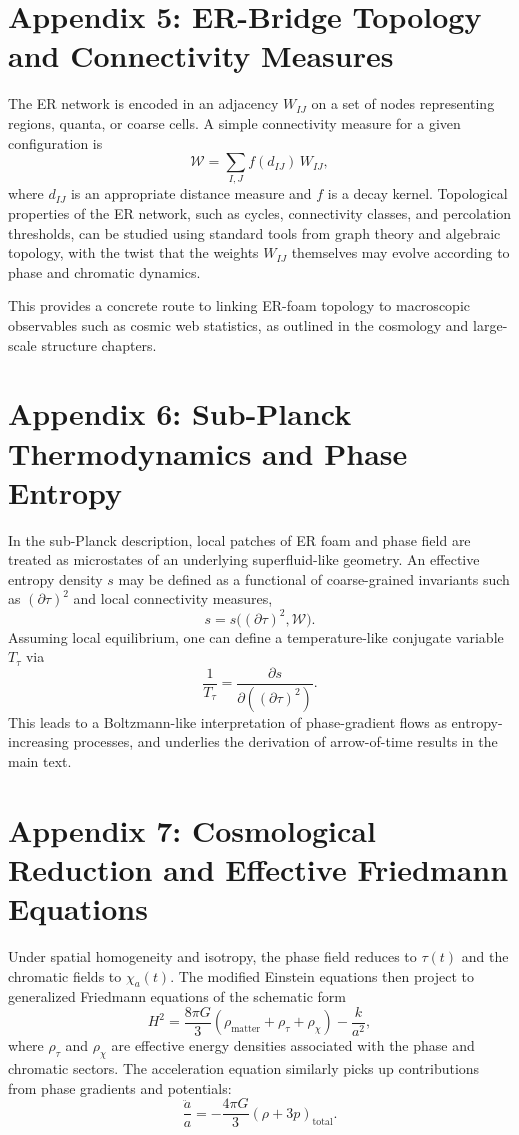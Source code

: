 \chapter{Appendix 5: ER-Bridge Topology and Connectivity Measures}

The ER network is encoded in an adjacency \(W_{IJ}\) on a set of nodes representing regions, quanta, or coarse cells.
A simple connectivity measure for a given configuration is
\[
\mathcal{W} = \sum_{I,J} f(d_{IJ})\,W_{IJ},
\]
where \(d_{IJ}\) is an appropriate distance measure and \(f\) is a decay kernel.
Topological properties of the ER network, such as cycles, connectivity classes, and percolation thresholds, can be studied using standard tools from graph theory and algebraic topology, with the twist that the weights \(W_{IJ}\) themselves may evolve according to phase and chromatic dynamics.

This provides a concrete route to linking ER-foam topology to macroscopic observables such as cosmic web statistics, as outlined in the cosmology and large-scale structure chapters.

\chapter{Appendix 6: Sub-Planck Thermodynamics and Phase Entropy}

In the sub-Planck description, local patches of ER foam and phase field are treated as microstates of an underlying superfluid-like geometry.
An effective entropy density \(s\) may be defined as a functional of coarse-grained invariants such as \((\partial\tau)^2\) and local connectivity measures,
\[
s = s\big((\partial\tau)^2, \mathcal{W}\big).
\]
Assuming local equilibrium, one can define a temperature-like conjugate variable \(T_\tau\) via
\[
\frac{1}{T_\tau} = \frac{\partial s}{\partial ((\partial\tau)^2)}.
\]
This leads to a Boltzmann-like interpretation of phase-gradient flows as entropy-increasing processes, and underlies the derivation of arrow-of-time results in the main text.

\chapter{Appendix 7: Cosmological Reduction and Effective Friedmann Equations}

Under spatial homogeneity and isotropy, the phase field reduces to \(\tau(t)\) and the chromatic fields to \(\chi_a(t)\).
The modified Einstein equations then project to generalized Friedmann equations of the schematic form
\[
H^2 = \frac{8\pi G}{3}\left(\rho_{\mathrm{matter}} + \rho_\tau + \rho_\chi\right) - \frac{k}{a^2},
\]
where \(\rho_\tau\) and \(\rho_\chi\) are effective energy densities associated with the phase and chromatic sectors.
The acceleration equation similarly picks up contributions from phase gradients and potentials:
\[
\frac{\ddot a}{a} = -\frac{4\pi G}{3}\left(\rho + 3p\right)_{\mathrm{total}}.
\]

